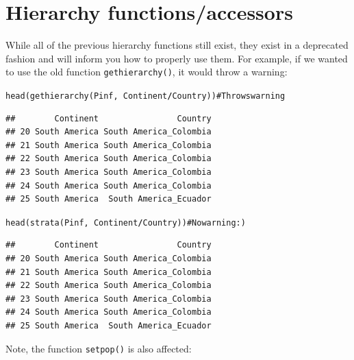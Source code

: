 \documentclass[letterpaper]{article}\usepackage[]{graphicx}\usepackage[]{color}
\makeatletter
\newcommand{\hlcom}[1]{\textcolor[rgb]{1,0.502,0}{#1}}%
\newcommand{\hlopt}[1]{\textcolor[rgb]{1,0,0.502}{\textbf{#1}}}%
\newcommand{\hlstd}[1]{\textcolor[rgb]{0,0,0}{#1}}%
\newcommand{\hlkwd}[1]{\textcolor[rgb]{0,0.267,0.4}{#1}}%
\newenvironment{kframe}{%
 \def\at@end@of@kframe{}%
 \ifinner\ifhmode%
  \def\at@end@of@kframe{\end{minipage}}%
  \begin{minipage}{\columnwidth}%
 \fi\fi%
 \def\FrameCommand##1{\hskip\@totalleftmargin \hskip-\fboxsep
 \colorbox{shadecolor}{##1}\hskip-\fboxsep
     \hskip-\linewidth \hskip-\@totalleftmargin \hskip\columnwidth}%
 \MakeFramed {\advance\hsize-\width
   \@totalleftmargin\z@ \linewidth\hsize
   \@setminipage}}%
 {\par\unskip\endMakeFramed%
 \at@end@of@kframe}
\newenvironment{knitrout}{}{} %
\makeatother
\begin{document}
\section{Hierarchy functions/accessors}

While all of the previous hierarchy functions still exist, they exist in a 
deprecated fashion and will inform you how to properly use them. For example,
if we wanted to use the old function \texttt{gethierarchy()}, it would throw a 
warning:

\begin{knitrout}
\color{fgcolor}\begin{kframe}
\begin{alltt}
\hlkwd{head}\hlstd{(}\hlkwd{gethierarchy}\hlstd{(Pinf,} \hlopt{~}\hlstd{Continent}\hlopt{/}\hlstd{Country))} \hlcom{# Throws warning}
\end{alltt}


{\ttfamily\noindent{}}\begin{verbatim}
##        Continent                Country
## 20 South America South America_Colombia
## 21 South America South America_Colombia
## 22 South America South America_Colombia
## 23 South America South America_Colombia
## 24 South America South America_Colombia
## 25 South America  South America_Ecuador
\end{verbatim}
\begin{alltt}
\hlkwd{head}\hlstd{(}\hlkwd{strata}\hlstd{(Pinf,} \hlopt{~}\hlstd{Continent}\hlopt{/}\hlstd{Country))}       \hlcom{# No warning :)}
\end{alltt}
\begin{verbatim}
##        Continent                Country
## 20 South America South America_Colombia
## 21 South America South America_Colombia
## 22 South America South America_Colombia
## 23 South America South America_Colombia
## 24 South America South America_Colombia
## 25 South America  South America_Ecuador
\end{verbatim}
\end{kframe}
\end{knitrout}

Note, the function \texttt{setpop()} is also affected:
\end{document}
